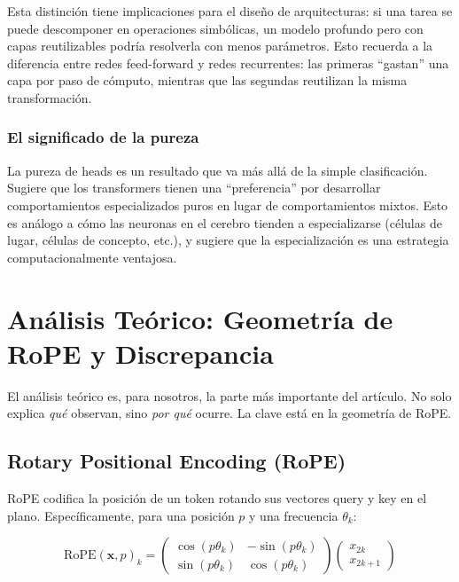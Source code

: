 \documentclass[12pt,a4paper,oneside]{report}
\begin{document}
Esta distinción tiene implicaciones para el diseño de arquitecturas: si una tarea se puede descomponer en operaciones simbólicas, un modelo profundo pero con capas reutilizables podría resolverla con menos parámetros. Esto recuerda a la diferencia entre redes feed-forward y redes recurrentes: las primeras ``gastan'' una capa por paso de cómputo, mientras que las segundas reutilizan la misma transformación.

\subsection{El significado de la pureza}

La pureza de heads es un resultado que va más allá de la simple clasificación. Sugiere que los transformers tienen una ``preferencia'' por desarrollar comportamientos especializados puros en lugar de comportamientos mixtos. Esto es análogo a cómo las neuronas en el cerebro tienden a especializarse (células de lugar, células de concepto, etc.), y sugiere que la especialización es una estrategia computacionalmente ventajosa.

\chapter{Análisis Teórico: Geometría de RoPE y Discrepancia}

El análisis teórico es, para nosotros, la parte más importante del artículo. No solo explica \emph{qué} observan, sino \emph{por qué} ocurre. La clave está en la geometría de RoPE.

\section{Rotary Positional Encoding (RoPE)}

RoPE codifica la posición de un token rotando sus vectores query y key en el plano. Específicamente, para una posición $p$ y una frecuencia $\theta_k$:

\[
\text{RoPE}(\mathbf{x}, p)_k = 
\begin{pmatrix}
\cos(p\theta_k) & -\sin(p\theta_k) \\
\sin(p\theta_k) & \cos(p\theta_k)
\end{pmatrix}
\begin{pmatrix}
x_{2k} \\
x_{2k+1}
\end{pmatrix}
\]
\end{document}
